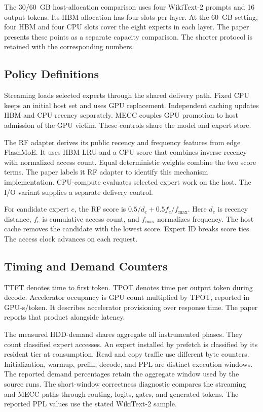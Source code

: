 \documentclass[conference,9pt,letterpaper]{IEEEtran}
\begin{document}
The 30/60~GB host-allocation comparison uses four WikiText-2 prompts and 16 output tokens. Its HBM allocation has four slots per layer. At the 60~GB setting, four HBM and four CPU slots cover the eight experts in each layer. The paper presents these points as a separate capacity comparison. The shorter protocol is retained with the corresponding numbers.

\subsection{Policy Definitions}
Streaming loads selected experts through the shared delivery path. Fixed CPU keeps an initial host set and uses GPU replacement. Independent caching updates HBM and CPU recency separately. MECC couples GPU promotion to host admission of the GPU victim. These controls share the model and expert store.

The RF adapter derives its public recency and frequency features from edge FlashMoE. It uses HBM LRU and a CPU score that combines inverse recency with normalized access count. Equal deterministic weights combine the two score terms. The paper labels it RF adapter to identify this mechanism implementation. CPU-compute evaluates selected expert work on the host. The I/O variant supplies a separate delivery control.

For candidate expert $e$, the RF score is $0.5/d_e+0.5f_e/f_{\max}$. Here $d_e$ is recency distance, $f_e$ is cumulative access count, and $f_{\max}$ normalizes frequency. The host cache removes the candidate with the lowest score. Expert ID breaks score ties. The access clock advances on each request.

\subsection{Timing and Demand Counters}
TTFT denotes time to first token. TPOT denotes time per output token during decode. Accelerator occupancy is GPU count multiplied by TPOT, reported in GPU-s/token. It describes accelerator provisioning over response time. The paper reports that product alongside latency.

The measured HDD-demand shares aggregate all instrumented phases. They count classified expert accesses. An expert installed by prefetch is classified by its resident tier at consumption. Read and copy traffic use different byte counters. Initialization, warmup, prefill, decode, and PPL are distinct execution windows. The reported demand percentages retain the aggregate window used by the source runs. The short-window correctness diagnostic compares the streaming and MECC paths through routing, logits, gates, and generated tokens. The reported PPL values use the stated WikiText-2 sample.
\end{document}
